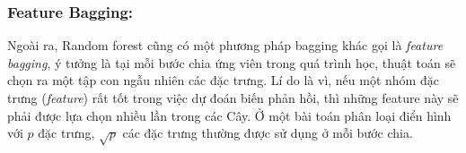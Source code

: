 \subsubsection{Feature Bagging:} 
      Ngoài ra, Random forest cũng có một phương pháp bagging khác gọi là \emph{feature bagging}, ý tưởng là tại mỗi bước chia ứng viên trong quá trình học, thuật toán sẽ chọn ra một tập con ngẫu nhiên các đặc trưng. Lí do là vì, nếu một nhóm đặc trưng (\emph{feature}) rất tốt trong việc dự đoán biến phản hồi, thì những feature này sẽ phải được lựa chọn nhiều lần trong các Cây. Ở một bài toán phân loại điển hình với $p$ đặc trưng, $\sqrt{p}$ các đặc trưng thường được sử dụng ở mỗi bước chia. 

